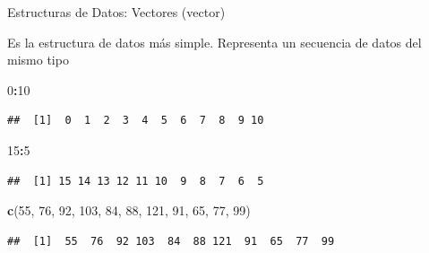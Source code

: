 \documentclass[ignorenonframetext,]{beamer}
\newenvironment{Shaded}{\begin{snugshade}}{\end{snugshade}}
\newcommand{\KeywordTok}[1]{\textcolor[rgb]{0.13,0.29,0.53}{\textbf{#1}}}
\newcommand{\DecValTok}[1]{\textcolor[rgb]{0.00,0.00,0.81}{#1}}
\newcommand{\OperatorTok}[1]{\textcolor[rgb]{0.81,0.36,0.00}{\textbf{#1}}}
\newcommand{\NormalTok}[1]{#1}
\begin{document}
\begin{frame}[fragile]{Estructuras de Datos: Vectores (vector)}

Es la estructura de datos más simple. Representa un secuencia de datos
del mismo tipo

\begin{Shaded}
\begin{Highlighting}[]
\DecValTok{0}\OperatorTok{:}\DecValTok{10}
\end{Highlighting}
\end{Shaded}

\begin{verbatim}
##  [1]  0  1  2  3  4  5  6  7  8  9 10
\end{verbatim}

\begin{Shaded}
\begin{Highlighting}[]
\DecValTok{15}\OperatorTok{:}\DecValTok{5}
\end{Highlighting}
\end{Shaded}

\begin{verbatim}
##  [1] 15 14 13 12 11 10  9  8  7  6  5
\end{verbatim}

\begin{Shaded}
\begin{Highlighting}[]
\KeywordTok{c}\NormalTok{(}\DecValTok{55}\NormalTok{, }\DecValTok{76}\NormalTok{, }\DecValTok{92}\NormalTok{, }\DecValTok{103}\NormalTok{, }\DecValTok{84}\NormalTok{, }\DecValTok{88}\NormalTok{, }\DecValTok{121}\NormalTok{, }\DecValTok{91}\NormalTok{, }\DecValTok{65}\NormalTok{, }\DecValTok{77}\NormalTok{, }\DecValTok{99}\NormalTok{)}
\end{Highlighting}
\end{Shaded}

\begin{verbatim}
##  [1]  55  76  92 103  84  88 121  91  65  77  99
\end{verbatim}

\end{frame}
\end{document}
